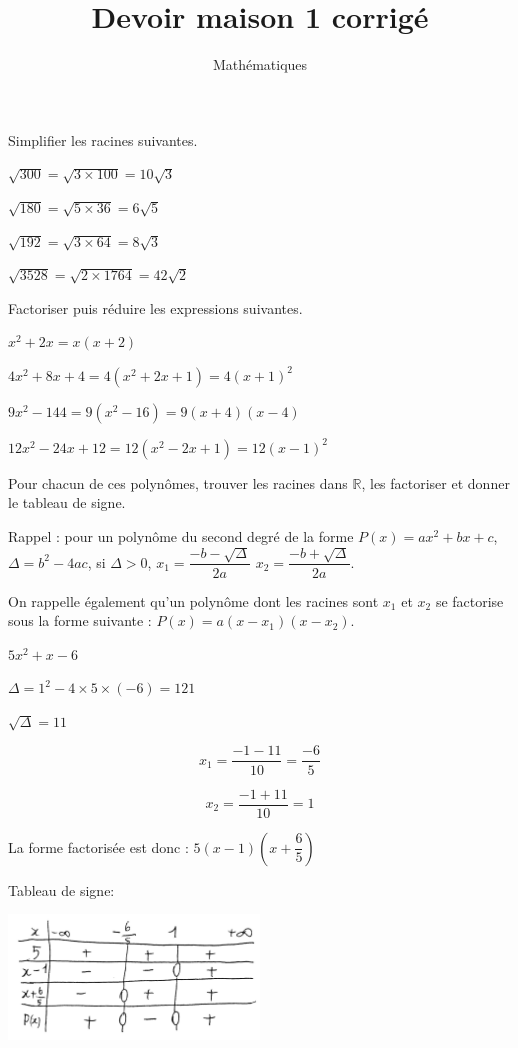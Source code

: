 \documentclass[a4paper,12pt]{scrartcl}
\date{}
\title{Devoir maison 1 corrigé}
\author{Mathématiques}
\begin{document}
\maketitle


Simplifier les racines suivantes.

\question{}
$\sqrt{300} = \sqrt{3 \times 100} = 10 \sqrt{3}$

\question{}
$\sqrt{180} = \sqrt{5 \times 36} = 6 \sqrt{5}$

\question{}
$\sqrt{192} = \sqrt{3 \times 64} = 8 \sqrt{3}$

\question{}
$\sqrt{3528} = \sqrt{2 \times 1764} = 42 \sqrt{2}$


Factoriser puis réduire les expressions suivantes.

\question{}
$x^2 + 2x = x(x+2)$

\question{}
$4x^2 + 8x + 4 = 4(x^2 + 2x + 1) = 4(x+1)^2$

\question{}
$9x^2 - 144 = 9(x^2 - 16) = 9(x+4)(x-4)$

\question{}
$12x^2 - 24x + 12 = 12(x^2 - 2x + 1) = 12(x-1)^2$


Pour chacun de ces polynômes, trouver les racines dans $\mathbb{R}$, les factoriser et donner le tableau de signe.

Rappel : pour un polynôme du second degré de la forme $P(x) = ax^2 + bx + c$, $\Delta = b^2 - 4ac$, si $\Delta > 0$, $x_1 = \dfrac{-b-\sqrt{\Delta}}{2a}$ $x_2 = \dfrac{-b+\sqrt{\Delta}}{2a}$.

On rappelle également qu'un polynôme dont les racines sont $x_1$ et $x_2$ se factorise sous la forme suivante : $P(x) = a(x-x_1)(x-x_2)$.

\question{}%
$5x^2 + x - 6$

$\Delta = 1^2 - 4 \times 5 \times (-6) = 121$

$\sqrt{\Delta} = 11$

$$x_1 = \dfrac{-1-11}{10} = \dfrac{-6}{5}$$

$$x_2 = \dfrac{-1+11}{10} = 1$$

La forme factorisée est donc : $5 \left(x - 1\right)\left(x + \dfrac{6}{5} \right)$

Tableau de signe:

\includegraphics[width=0.5\textwidth]{pics/1.png}
\end{document}
